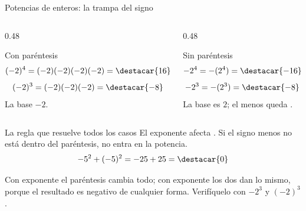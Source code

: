 \documentclass[aspectratio=169,10pt]{beamer}
\begin{document}
\begin{frame}{Potencias de enteros: la trampa del signo}
  \scriptsize
  \begin{columns}[T,onlytextwidth]
    \begin{column}{0.48\textwidth}
      \begin{block}{Con paréntesis}
        \scriptsize
        \[ (-2)^4 = (-2)(-2)(-2)(-2) = \destacar{16} \]
        \[ (-2)^3 = (-2)(-2)(-2) = \destacar{-8} \]
        La base  $-2$.
      \end{block}
    \end{column}
    \begin{column}{0.48\textwidth}
      \begin{alertblock}{Sin paréntesis}
        \scriptsize
        \[ -2^4 = -(2^4) = \destacar{-16} \]
        \[ -2^3 = -(2^3) = \destacar{-8} \]
        La base es $2$; el menos queda .
      \end{alertblock}
    \end{column}
  \end{columns}

  \vspace{0.15cm}
  \begin{exampleblock}{La regla que resuelve todos los casos}
    \scriptsize
    El exponente afecta . Si el signo
    menos no está dentro del paréntesis, no entra en la potencia.
    \[ -5^2 + (-5)^2 = -25 + 25 = \destacar{0} \]
  \end{exampleblock}

  \vspace{0.05cm}
  {\tiny\color{uniGris} Con exponente  el paréntesis cambia todo; con
  exponente  los dos dan lo mismo, porque el resultado es negativo
  de cualquier forma. Verifíquelo con $-2^3$ y $(-2)^3$.}
\end{frame}
\end{document}
